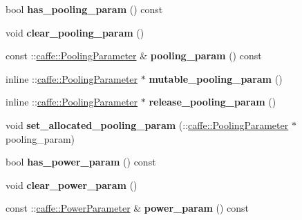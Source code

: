 \begin{DoxyCompactItemize}
bool {\bfseries has\+\_\+pooling\+\_\+param} () const
\item 
\mbox{\label{classcaffe_1_1_layer_parameter_a99b7da91c0e22d2c56dfecba097cceef}} 
void {\bfseries clear\+\_\+pooling\+\_\+param} ()
\item 
\mbox{\label{classcaffe_1_1_layer_parameter_ae341315a6a397cef98006d830c4f43c6}} 
const \+::\mbox{\hyperlink{classcaffe_1_1_pooling_parameter}{caffe\+::\+Pooling\+Parameter}} \& {\bfseries pooling\+\_\+param} () const
\item 
\mbox{\label{classcaffe_1_1_layer_parameter_a6b9dbb8285d154e120f5d69ed4206bce}} 
inline \+::\mbox{\hyperlink{classcaffe_1_1_pooling_parameter}{caffe\+::\+Pooling\+Parameter}} $\ast$ {\bfseries mutable\+\_\+pooling\+\_\+param} ()
\item 
\mbox{\label{classcaffe_1_1_layer_parameter_a4c08f23825e455bc4fdb3ea65d93d03f}} 
inline \+::\mbox{\hyperlink{classcaffe_1_1_pooling_parameter}{caffe\+::\+Pooling\+Parameter}} $\ast$ {\bfseries release\+\_\+pooling\+\_\+param} ()
\item 
\mbox{\label{classcaffe_1_1_layer_parameter_aa9d3070b7c30a8183e6c69873ee52850}} 
void {\bfseries set\+\_\+allocated\+\_\+pooling\+\_\+param} (\+::\mbox{\hyperlink{classcaffe_1_1_pooling_parameter}{caffe\+::\+Pooling\+Parameter}} $\ast$pooling\+\_\+param)
\item 
\mbox{\label{classcaffe_1_1_layer_parameter_a6f4f4513009f0fe5203eab8606b0f649}} 
bool {\bfseries has\+\_\+power\+\_\+param} () const
\item 
\mbox{\label{classcaffe_1_1_layer_parameter_a49a7acb335a5552254830e196618c9f3}} 
void {\bfseries clear\+\_\+power\+\_\+param} ()
\item 
\mbox{\label{classcaffe_1_1_layer_parameter_a815af936f7bc00428c2cba226ea84fb1}} 
const \+::\mbox{\hyperlink{classcaffe_1_1_power_parameter}{caffe\+::\+Power\+Parameter}} \& {\bfseries power\+\_\+param} () const
\item 

\end{DoxyCompactItemize}

